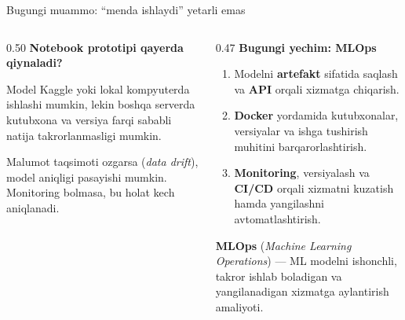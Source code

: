 \documentclass[aspectratio=169,11pt]{beamer}
\newcommand{\uzq}{\textquotesingle{}}   %
\begin{document}
\begin{frame}{Bugungi muammo: ``menda ishlaydi'' yetarli emas}
  \small

  \begin{columns}[T,totalwidth=\textwidth]
    \begin{column}{0.50\textwidth}
      \textbf{Notebook prototipi qayerda qiynaladi?}\\[3pt]

      \begin{tcolorbox}[warnbox,title={Faqat bitta muhitda ishlaydi},top=2pt,bottom=2pt]
        \footnotesize
        Model Kaggle yoki lokal kompyuterda ishlashi mumkin, lekin boshqa
        serverda kutubxona va versiya farqi sababli natija takrorlanmasligi mumkin.
      \end{tcolorbox}

      \vspace{3pt}

      \begin{tcolorbox}[warnbox,title={Vaqt o\uzq{}tishi bilan sifati pasayishi mumkin},top=2pt,bottom=2pt]
        \footnotesize
        Ma\uzq{}lumot taqsimoti o\uzq{}zgarsa (\textit{data drift}), model aniqligi
        pasayishi mumkin. Monitoring bo\uzq{}lmasa, bu holat kech aniqlanadi.
      \end{tcolorbox}
    \end{column}

    \begin{column}{0.47\textwidth}
      \textbf{Bugungi yechim: MLOps}\\[4pt]

      \begin{enumerate}\setlength\itemsep{5pt}
        \item Modelni \textbf{artefakt} sifatida saqlash va
              \textbf{API} orqali xizmatga chiqarish.

        \item \textbf{Docker} yordamida kutubxonalar, versiyalar va ishga tushirish
              muhitini barqarorlashtirish.

        \item \textbf{Monitoring}, versiyalash va \textbf{CI/CD} orqali xizmatni
              kuzatish hamda yangilashni avtomatlashtirish.
      \end{enumerate}

      \vspace{4pt}

      \begin{tcolorbox}[okbox,top=2pt,bottom=2pt]
        \footnotesize
        \textbf{MLOps} (\textit{Machine Learning Operations}) ---
        ML modelni ishonchli, takror ishlab bo\uzq{}ladigan va yangilanadigan
        xizmatga aylantirish amaliyoti.
      \end{tcolorbox}
    \end{column}
  \end{columns}
\end{frame}
\end{document}
